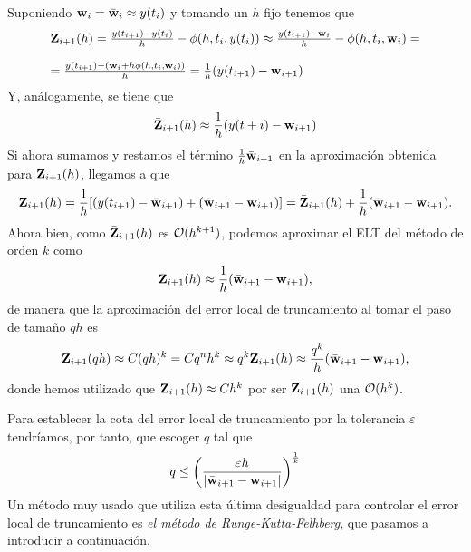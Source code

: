 Suponiendo $\vb{w}{}_i = \bar{\vb{w}{}}_i \approx y(t_i)$ y tomando un $h$ fijo tenemos que
\begin{equation*}
\begin{array}{l}
    \vb{Z}{}_{i+1}(h) = \frac{y(t_{i+1}) - y(t_i)}{h} - \phi(h, t_i, y(t_i)) \approx  \frac{y(t_{i+1}) - \vb{w}{}_i}{h} - \phi(h, t_i, \vb{w}{}_i) =\\
    \\
     =\frac{y(t_{i+1}) - (\vb{w}{}_i + h\phi(h, t_i, \vb{w}{}_i))}{h} = \frac{1}{h}(y(t_{i+1})-\vb{w}{}_{i+1})
\end{array}
\end{equation*}
Y, análogamente, se tiene que 
\begin{equation*}
    \bar{\vb{Z}{}}_{i+1}(h) \approx \frac{1}{h}(y(t+i)-\bar{\vb{w}{}}_{i+1})
\end{equation*}
Si ahora sumamos y restamos el término $\frac{1}{h}\bar{\vb{w}{}}_{i+1}$
en la aproximación obtenida para $\vb{Z}{}_{i+1}(h)$,
llegamos a que
\begin{equation*}
    \vb{Z}{}_{i+1}(h) = \frac{1}{h}[(y(t_{i+1})-\bar{\vb{w}{}}_{i+1}) + (\bar{\vb{w}{}}_{i+1} - \vb{w}{}_{i+1})] = \bar{\vb{Z}{}}_{i+1}(h) + \frac{1}{h}(\bar{\vb{w}{}}_{i+1}-\vb{w}{}_{i+1}).
\end{equation*}
Ahora bien, como $\bar{\vb{Z}{}}_{i+1}(h)$ es $\vb{\mathcal{O}}{}(h^{k+1})$,
podemos aproximar el ELT del método de orden $k$ como
\begin{equation*}
\vb{Z}{}_{i+1}(h) \approx \frac{1}{h}(\bar{\vb{w}{}}_{i+1}-\vb{w}{}_{i+1}),
\end{equation*}
de manera que la aproximación del error local de truncamiento
al tomar el paso de tamaño $qh$ es
\begin{equation*}
    \vb{Z}{}_{i+1}(qh)\approx C(qh)^k = Cq^nh^k \approx q^k \vb{Z}{}_{i+1}(h) \approx \frac{q^k}{h}(\bar{\vb{w}{}}_{i+1}-\vb{w}{}_{i+1}),
\end{equation*}
donde hemos utilizado que $\vb{Z}{}_{i+1}(h) \approx Ch^k$
por ser $\vb{Z}{}_{i+1}(h)$ una $\vb{\mathcal{O}}{}(h^k)$.

Para establecer la cota del error local de truncamiento
por la tolerancia $\varepsilon$ tendríamos, por tanto,
que escoger $q$ tal que
\begin{equation*}
    q \leq \left(\frac{\varepsilon h}{|\bar{\vb{w}{}}_{i+1} - \vb{w}{}_{i+1}|}\right)^{\frac{1}{k}}
\end{equation*}
Un método muy usado que utiliza esta última desigualdad para
controlar el error local de truncamiento es
\emph{el método de Runge-Kutta-Felhberg},
que pasamos a introducir a continuación.

